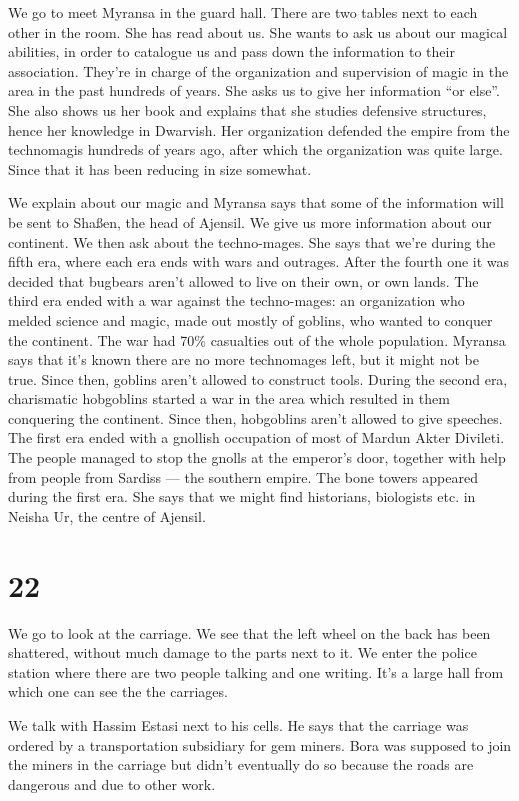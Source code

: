 \documentclass[10pt,a4paper,twoside,openany,hidelinks]{book}
\begin{document}
We go to meet Myransa in the guard hall. There are two tables next to each other in the room. She has read about us. She wants to ask us about our magical abilities, in order to catalogue us and pass down the information to their association. They're in charge of the organization and supervision of magic in the area in the past hundreds of years. She asks us to give her information ``or else''. She also shows us her book and explains that she studies defensive structures, hence her knowledge in Dwarvish.
Her organization defended the empire from the technomagis hundreds of years ago, after which the organization was quite large. Since that it has been reducing in size somewhat.

We explain about our magic and Myransa says that some of the information will be sent to Shaßen, the head of Ajensil. We give us more information about our continent. We then ask about the techno-mages. She says that we're during the fifth era, where each era ends with wars and outrages. After the fourth one it was decided that bugbears aren't allowed to live on their own, or own lands. The third era ended with a war against the techno-mages: an organization who melded science and magic, made out mostly of goblins, who wanted to conquer the continent. The war had 70\% casualties out of the whole population. Myransa says that it's known there are no more technomages left, but it might not be true. Since then, goblins aren't allowed to construct tools. During the second era, charismatic hobgoblins started a war in the area which resulted in them conquering the continent. Since then, hobgoblins aren't allowed to give speeches. The first era ended with a gnollish occupation of most of Mardun Akter Divileti. The people managed to stop the gnolls at the emperor's door, together with help from people from Sardiss --- the southern empire. The bone towers appeared during the first era. She says that we might find historians, biologists etc. in Neisha Ur, the centre of Ajensil.

\chapter*{22}

We go to look at the carriage. We see that the left wheel on the back has been shattered, without much damage to the parts next to it. We enter the police station where there are two people talking and one writing. It's a large hall from which one can see the the carriages.

We talk with Hassim Estasi next to his cells. He says that the carriage was ordered by a transportation subsidiary for gem miners. Bora was supposed to join the miners in the carriage but didn't eventually do so because the roads are dangerous and due to other work.
\end{document}
